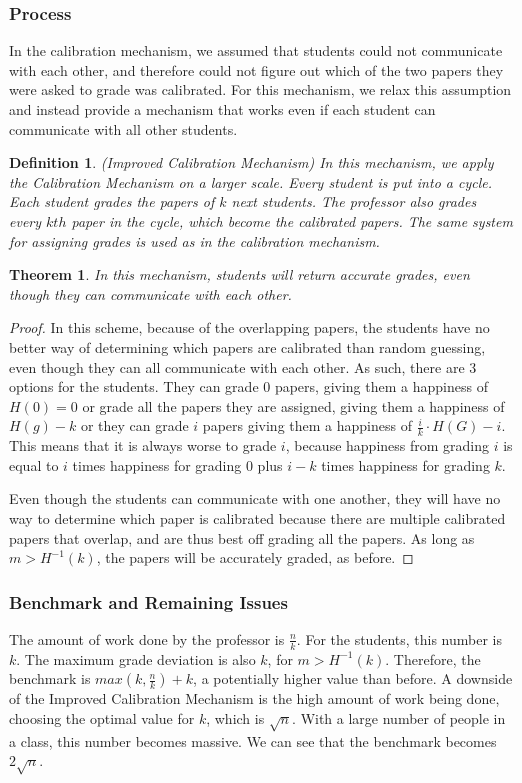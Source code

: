 \documentclass[12pt, Arial]{article}
\newtheorem{theorem}{Theorem}
\newtheorem{definition}{Definition}
\begin{document}
\subsubsection{Process}
In the calibration mechanism, we assumed that students could not communicate with each other, and therefore could not figure out which of the two papers they were asked to grade was calibrated. For this mechanism, we relax this assumption and instead provide a mechanism that works even if each student can communicate with all other students.
\begin{definition}(Improved Calibration Mechanism)
In this mechanism, we apply the Calibration Mechanism on a larger scale. Every student is put into a cycle. Each student grades the papers of $k$ next students. The professor also grades every $kth$ paper in the cycle, which become the calibrated papers. The same system for assigning grades is used as in the calibration mechanism.
\end{definition}
\begin{theorem}
In this mechanism, students will return accurate grades, even though they can communicate with each other.
\end{theorem}
\begin{proof}
In this scheme, because of the overlapping papers, the students have no better way of determining which papers are calibrated than random guessing, even though they can all communicate with each other. As such, there are 3 options for the students. They can grade 0 papers, giving them a happiness of $H(0) = 0$ or grade all the papers they are assigned, giving them a happiness of $H(g) - k$ or they can grade $i$ papers giving them a happiness of $\frac{i}{k} \cdot H(G)-i$. This means that it is always worse to grade $i$, because happiness from grading $i$ is equal to $i$ times happiness for grading 0 plus $i-k$ times happiness for grading $k$.

Even though the students can communicate with one another, they will have no way to determine which paper is calibrated because there are multiple calibrated papers that overlap, and are thus best off grading all the papers. As long as $m > H^{-1}(k)$, the papers will be accurately graded, as before.

\end{proof}
\subsubsection{Benchmark and Remaining Issues}
The amount of work done by the professor is $\frac{n}{k}$. For the students, this number is $k$. The maximum grade deviation is also $k$, for $m > H^{-1}(k)$. Therefore, the benchmark is $max(k, \frac{n}{k}) + k$, a potentially higher value than before. A downside of the Improved Calibration Mechanism is the high amount of work being done, choosing the optimal value for $k$, which is $\sqrt{n}$. With a large number of people in a class, this number becomes massive. We can see that the benchmark becomes $2\sqrt{n}$.
\end{document}
